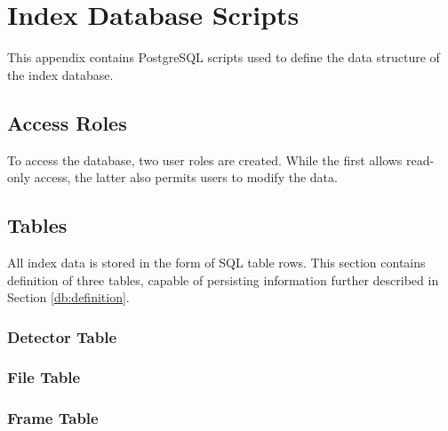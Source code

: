 \chapter{Index Database Scripts}
This appendix contains PostgreSQL scripts used to define the data structure of the index database.

\section{Access Roles}
To access the database, two user roles are created. While the first allows read-only access, the latter also permits users to modify the data.
~

\section{Tables}\label{section:table-definition}
All index data is stored in the form of SQL table rows. This section contains definition of three tables, capable of persisting information further described in Section \ref{db:definition}.

\subsection{Detector Table}

\subsection{File Table}

\subsection{Frame Table}
